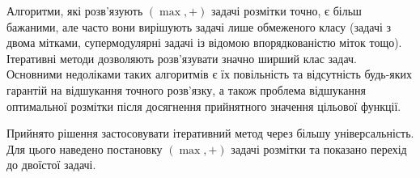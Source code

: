 \chapterConclusion

Алгоритми, які розв'язують $(\max ,+)$ задачі розмітки точно, є більш бажаними,
але часто вони вирішують задачі лише обмеженого
класу (задачі з двома мітками, супермодулярні задачі із відомою впорядкованістю
міток тощо). Ітеративні методи дозволяють розв'язувати значно ширший клас задач.
Основними недоліками таких алгоритмів є їх повільність та відсутність будь-яких
гарантій на відшукання точного розв'язку, а також проблема відшукання оптимальної
розмітки після досягнення прийнятного значення цільової функції.

Прийнято рішення застосовувати ітеративний метод через більшу універсальність.
Для цього наведено постановку $(\max,+)$ задачі розмітки та показано перехід до двоїстої задачі.
